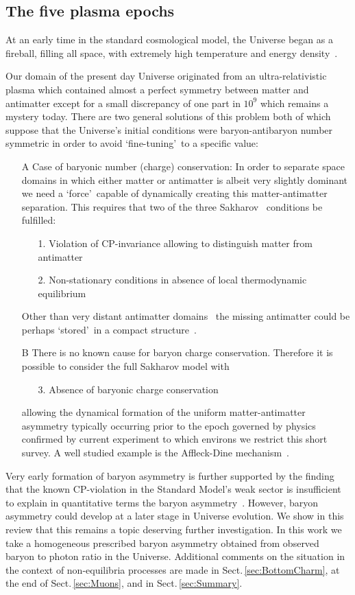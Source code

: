 \documentclass[universe,article,submit,moreauthors,pdftex,a4paper]{Definitions/mdpi}
\newcommand*{\rsec}[1]{Sect.\,{\ref{#1}}}
\newcommand*{\xblue}{\color{blue}}
\begin{document}
\subsection{The five plasma epochs}\label{sec:Timeline}
\noindent At an early time in the standard cosmological model, the Universe began as a fireball, filling all space, with extremely high temperature and energy density~\cite{Rafelski:2015cxa}. {\xblue Our domain of the present day Universe originated from an ultra-relativistic plasma which contained almost a perfect symmetry between matter and antimatter except for a small discrepancy of one part in $10^{9}$ which remains a mystery today. There are two general solutions of this problem both of which suppose that the Universe's initial conditions were baryon-antibaryon number symmetric in order to avoid \lq fine-tuning\rq\ to a specific value:
\begin{itemize}
\item[A] Case of baryonic number (charge) conservation: In order to separate space domains in which either matter or antimatter is albeit very slightly dominant we  need a \lq force\rq\ capable of dynamically creating this matter-antimatter separation. This requires that two of the three Sakharov~\cite{Sakharov:1967dj,Sakharov:1988vdp} conditions be fulfilled:
\begin{itemize}
 \item[1.] Violation of CP-invariance allowing to distinguish matter from antimatter
 \item[2.] Non-stationary conditions in absence of local thermodynamic equilibrium
\end{itemize}
Other than very distant antimatter domains~\cite{Cohen:1997ac} the missing antimatter could be perhaps \lq stored\rq\ in a compact structure~\cite{Khlopov:2000as,Blinnikov:2014nea,Khlopov:2023dbg}. 
\item[B] There is no known cause for baryon charge conservation. Therefore it is possible to consider the full Sakharov model with 
\begin{itemize}
 \item[3.] Absence of baryonic charge conservation 
\end{itemize}
allowing the dynamical formation of the uniform matter-antimatter asymmetry typically occurring prior to the epoch governed by physics confirmed by current experiment to which environs we restrict this short survey. A well studied example is the Affleck-Dine
mechanism~\cite{Affleck:1984fy}.
\end{itemize} 
Very early formation of baryon asymmetry is further supported by the finding that the known CP-violation in the Standard Model's weak sector is insufficient to explain in quantitative terms the baryon asymmetry~\cite{Rubakov:1996vz}. However,  baryon asymmetry could  develop at a later stage in Universe evolution. We show in this review that this remains a topic deserving further investigation. In this work we take a homogeneous prescribed baryon asymmetry obtained from observed baryon to photon ratio in the Universe. Additional comments on the situation in the context of non-equilibria processes are made in \rsec{sec:BottomCharm}, at the end of \rsec{sec:Muons}, and in \rsec{sec:Summary}. 

}
\end{document}
